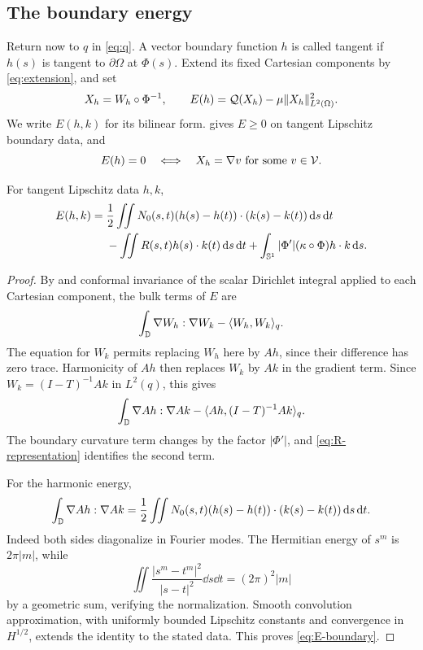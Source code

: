 \subsection{The boundary energy}\label{subsec:energy}

Return now to $q$ in \eqref{eq:q}. A vector boundary function $h$ is called tangent if $h(s)$ is tangent to $\partial\Omega$ at $\Phi(s)$. Extend its fixed Cartesian components by \eqref{eq:extension}, and set
\[
X_h=W_h\circ\Phi^{-1},\qquad
E(h)=\mathcal Q(X_h)-\mu\lVert X_h\rVert_{L^2(\Omega)}^2.
\]
We write $E(h,k)$ for its bilinear form.  gives $E\ge0$ on tangent Lipschitz boundary data, and
\begin{equation}\label{eq:E-nullspace}
E(h)=0\quad\Longleftrightarrow\quad
X_h=\nabla v\text{ for some }v\in\mathcal V.
\end{equation}

\begin{lemma}\label{lem:boundary-energy}
For tangent Lipschitz data $h,k$,
\begin{align}
E(h,k)={}&\frac12\iint N_0(s,t)
(h(s)-h(t))\cdot(k(s)-k(t))\,\mathrm d s\,\mathrm d t\notag\\
&-\iint R(s,t)h(s)\cdot k(t)\,\mathrm d s\,\mathrm d t
+\int_{\mathbb S^1}|\Phi'|(\kappa\circ\Phi)h\cdot k\,\mathrm d s.
\label{eq:E-boundary}
\end{align}
\end{lemma}
\begin{proof}
By  and conformal invariance of the scalar Dirichlet integral applied to each Cartesian component, the bulk terms of $E$ are
\[
\int_\mathbb D\nabla W_h:\nabla W_k-\langle W_h,W_k\rangle_q.
\]
The equation for $W_k$ permits replacing $W_h$ here by $Ah$, since their difference has zero trace. Harmonicity of $Ah$ then replaces $W_k$ by $Ak$ in the gradient term. Since $W_k=(I-T)^{-1}Ak$ in $L^2(q)$, this gives
\[
\int_\mathbb D\nabla Ah:\nabla Ak-\langle Ah,(I-T)^{-1}Ak\rangle_q.
\]
The boundary curvature term changes by the factor $|\Phi'|$, and \eqref{eq:R-representation} identifies the second term.

For the harmonic energy,
\begin{equation}\label{eq:harmonic-energy}
\int_\mathbb D\nabla Ah:\nabla Ak
=\frac12\iint N_0(s,t)(h(s)-h(t))\cdot(k(s)-k(t))\,\mathrm d s\,\mathrm d t.
\end{equation}
Indeed both sides diagonalize in Fourier modes. The Hermitian energy of $s^m$ is $2\pi|m|$, while
\[
\iint\frac{|s^m-t^m|^2}{|s-t|^2}\dd s\dd t=(2\pi)^2|m|
\]
by a geometric sum, verifying the normalization. Smooth convolution approximation, with uniformly bounded Lipschitz constants and convergence in $H^{1/2}$, extends the identity to the stated data. This proves \eqref{eq:E-boundary}.
\end{proof}

